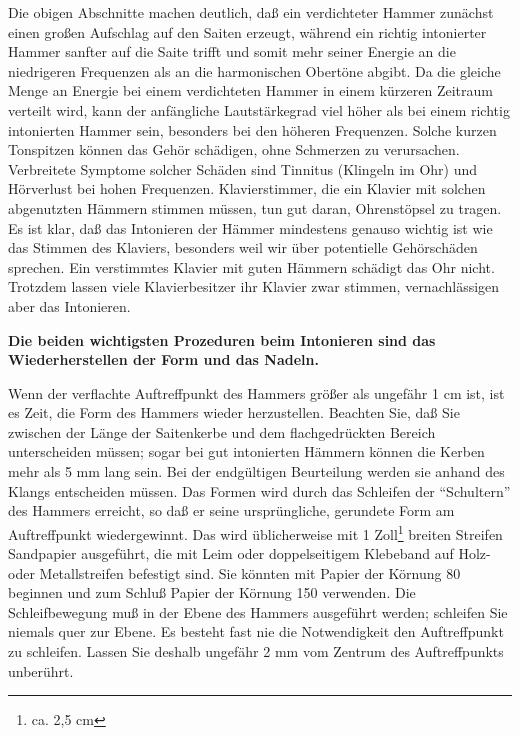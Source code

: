 Die obigen Abschnitte machen deutlich, daß ein verdichteter Hammer zunächst einen großen Aufschlag auf den Saiten erzeugt, während ein richtig intonierter Hammer sanfter auf die Saite trifft und somit mehr seiner Energie an die niedrigeren Frequenzen als an die harmonischen Obertöne abgibt.
Da die gleiche Menge an Energie bei einem verdichteten Hammer in einem kürzeren Zeitraum verteilt wird, kann der anfängliche Lautstärkegrad viel höher als bei einem richtig intonierten Hammer sein, besonders bei den höheren Frequenzen.
Solche kurzen Tonspitzen können das Gehör schädigen, ohne Schmerzen zu verursachen.
Verbreitete Symptome solcher Schäden sind Tinnitus (Klingeln im Ohr) und Hörverlust bei hohen Frequenzen.
Klavierstimmer, die ein Klavier mit solchen abgenutzten Hämmern stimmen müssen, tun gut daran, Ohrenstöpsel zu tragen.
Es ist klar, daß das Intonieren der Hämmer mindestens genauso wichtig ist wie das Stimmen des Klaviers, besonders weil wir über potentielle Gehörschäden sprechen.
Ein verstimmtes Klavier mit guten Hämmern schädigt das Ohr nicht.
Trotzdem lassen viele Klavierbesitzer ihr Klavier zwar stimmen, vernachlässigen aber das Intonieren.

\textbf{Die beiden wichtigsten Prozeduren beim Intonieren sind das Wiederherstellen der Form und das Nadeln.}

Wenn der verflachte Auftreffpunkt des Hammers größer als ungefähr 1 cm ist, ist es Zeit, die Form des Hammers wieder herzustellen.
Beachten Sie, daß Sie zwischen der Länge der Saitenkerbe und dem flachgedrückten Bereich unterscheiden müssen; sogar bei gut intonierten Hämmern können die Kerben mehr als 5 mm lang sein.
Bei der endgültigen Beurteilung werden sie anhand des Klangs entscheiden müssen.
Das Formen wird durch das Schleifen der \enquote{Schultern} des Hammers erreicht, so daß er seine ursprüngliche, gerundete Form am Auftreffpunkt wiedergewinnt.
Das wird üblicherweise mit 1 Zoll\footnote{ca. 2,5 cm} breiten Streifen Sandpapier ausgeführt, die mit Leim oder doppelseitigem Klebeband auf Holz- oder Metallstreifen befestigt sind.
Sie könnten mit Papier der Körnung 80 beginnen und zum Schluß Papier der Körnung 150 verwenden.
Die Schleifbewegung muß in der Ebene des Hammers ausgeführt werden; schleifen Sie niemals quer zur Ebene.
Es besteht fast nie die Notwendigkeit den Auftreffpunkt zu schleifen.
Lassen Sie deshalb ungefähr 2 mm vom Zentrum des Auftreffpunkts unberührt.

